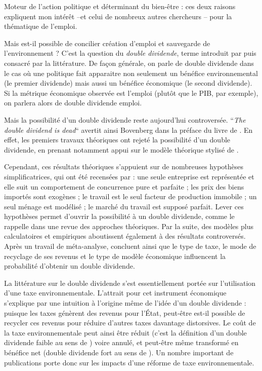 Moteur de l'action politique et déterminant du bien-être : ces deux raisons expliquent mon intérêt --et celui de nombreux autres chercheurs -- pour la thématique de l'emploi.

Mais est-il possible de concilier création d'emploi et sauvegarde de l'environnement ? C'est la question du \textit{double dividende}, terme introduit par \citet{Pearce1991} puis consacré par la littérature. 
De façon générale, on parle de double dividende dans le cas où une politique fait apparaitre non seulement un bénéfice environnemental (le premier dividende) mais aussi un bénéfice économique (le second dividende). 
Si la métrique économique observée est l'emploi (plutôt que le PIB, par exemple), on parlera alors de double dividende emploi.

Mais la possibilité d'un double dividende reste aujourd'hui controversée. “\textit{The double dividend is dead}“ avertit ainsi Bovenberg dans la préface du livre de \citet{DeMooij2000}. En effet, les premiers travaux théoriques ont rejeté la possibilité d'un double dividende, en prenant notamment appui sur le modèle théorique stylisé de \citet{Bovenberg1994a}. 

Cependant, ces résultats théoriques s'appuient sur de nombreuses hypothèses simplificatrices, qui ont été recensées par \citet{Thubin2012} : une seule entreprise est représentée et elle suit un comportement de concurrence pure et parfaite ; les prix des biens importés sont exogènes ; le travail est le seul facteur de production immobile ; un seul ménage est modélisé ; le marché du travail est supposé parfait. 
Lever ces hypothèses permet d'ouvrir la possibilité à un double dividende, comme le rappelle \citet{Chiroleu-Assouline2001a} dans une revue des approches théoriques. Par la suite, des modèles plus calculatoires et empiriques aboutissent également à des résultats controversés. Après un travail de méta-analyse, \citet{Patuelli2005} concluent ainsi que le type de taxe, le mode de recyclage de ses revenus et le type de modèle économique influencent la probabilité d'obtenir un double dividende.

La littérature sur le double dividende s'est essentiellement portée sur l'utilisation d'une taxe environnementale. L'attrait pour cet instrument économique s'explique par une intuition à l'origine même de l'idée d'un double dividende : puisque les taxes génèrent des revenus pour l'État, peut-être est-il possible de recycler ces revenus pour réduire d'autres taxes davantage distorsives. Le coût de la taxe environnementale peut ainsi être réduit (c'est la définition d'un double dividende faible au sens de \citet{Goulder1994}) voire annulé, et peut-être même transformé en bénéfice net (double dividende fort au sens de \citet{Goulder1994}). Un nombre important de publications porte donc sur les impacts d'une réforme de taxe environnementale. 

